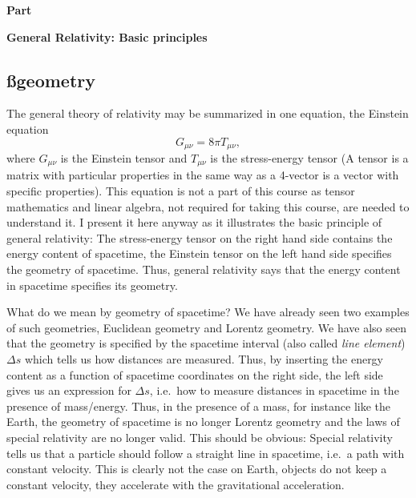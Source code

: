 {{\centerline{\bf\LARGE Part \PartName}}\vspace*{0.25cm}
{\centerline{\bf\LARGE General Relativity:  Basic principles}}

\vspace*{1cm}

\begin{multicols}{2}

\section{\ss geometry}
\label{sect:geometry}

The general theory of relativity may be summarized in one equation, the Einstein equation
\[
G_{\mu\nu}=8\pi T_{\mu\nu},
\]
where $G_{\mu\nu}$ is the Einstein tensor and $T_{\mu\nu}$ is the stress-energy tensor (A tensor is a matrix with particular properties in the same way as a 4-vector is a vector with specific properties). This equation is not a part of this course as tensor mathematics and linear algebra, not required for taking this course, are needed to understand it. I present it here anyway as it illustrates the basic principle of general relativity: The stress-energy tensor on the right hand side contains the energy content of spacetime, the Einstein tensor on the left hand side specifies the geometry of spacetime. Thus, general relativity says that the energy content in spacetime specifies its geometry. 

What do we mean by geometry of spacetime? We have already seen two examples of such geometries, Euclidean geometry and Lorentz geometry. We have also seen that the geometry is specified by the spacetime interval (also called {\it line element}) $\Delta s$ which tells us how distances are measured. Thus, by inserting the energy content as a function of spacetime coordinates on the right side, the left side gives us an expression for $\Delta s$, i.e.\ how to measure distances in spacetime in the presence of mass/energy. Thus, in the presence of a mass, for instance like the Earth, the geometry of spacetime is no longer Lorentz geometry and the laws of special relativity are no longer valid. This should be obvious: Special relativity tells us that a particle should follow a straight line in spacetime, i.e.\ a path with constant velocity. This is clearly not the case on Earth, objects do not keep a constant velocity, they accelerate with the gravitational acceleration. 


\end{multicols}}

